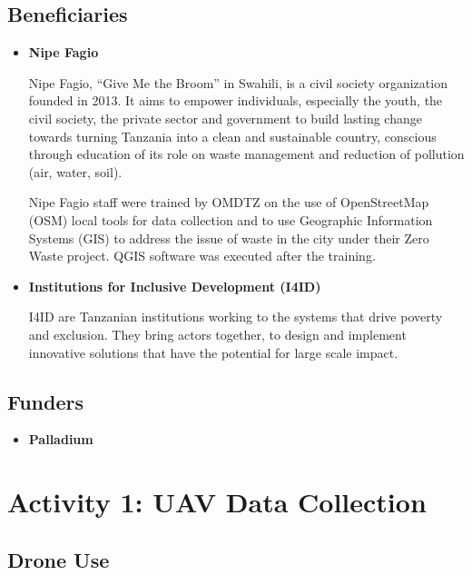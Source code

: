 \documentclass[a4paper,12pt,twoside]{article}
\begin{document}
\subsection{Beneficiaries}

    \begin{itemize}
        \item \textbf{Nipe Fagio}
    
        Nipe Fagio, “Give Me the Broom” in Swahili, is a civil society organization founded in 2013. It aims to empower individuals, especially the youth, the civil society, the private sector and government to build lasting change towards turning Tanzania into a clean and sustainable country, conscious through education of its role on waste management and reduction of pollution (air, water, soil).
    
        Nipe Fagio staff were trained by OMDTZ on the use of OpenStreetMap (OSM) local tools for data collection and to use Geographic Information Systems (GIS) to address the issue of waste in the city under their Zero Waste project. QGIS software was executed after the training.

        \item \textbf{Institutions for Inclusive Development (I4ID)}
    
        I4ID are Tanzanian institutions working to the systems that drive poverty and exclusion. They bring actors together, to design and implement innovative solutions that have the potential for large scale impact.
    
    \end{itemize}

\subsection{Funders}

    \begin{itemize}
        \item \textbf{Palladium}
    
        \lipsum[0-1]
    
    \end{itemize}   

\section{Activity 1: UAV Data Collection}

\subsection{Drone Use}
\end{document}
